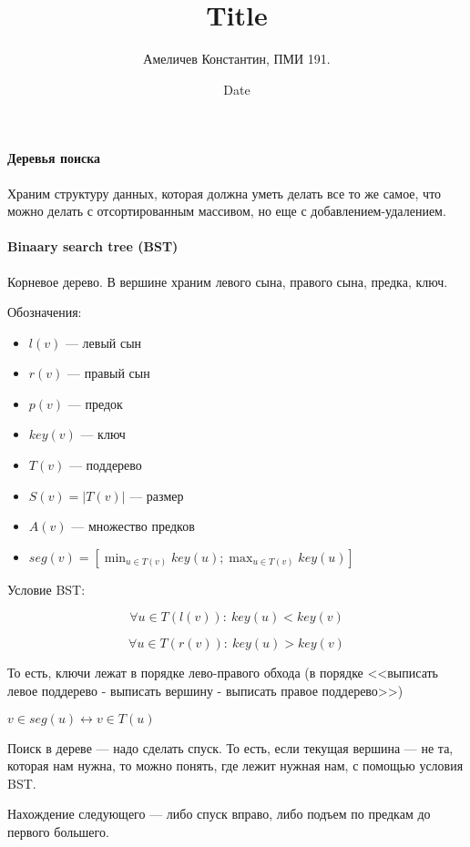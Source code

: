\documentclass[12pt]{article}
\title{Title}
\author{Амеличев Константин, ПМИ 191.}
\date{Date}
\begin{document}
\paragraph{Деревья поиска}
\hspace{\fill}
Храним структуру данных, которая должна уметь делать все то же самое, что можно делать с отсортированным массивом, но еще с добавлением-удалением.

\paragraph{Binaary search tree (BST)}

Корневое дерево. В вершине храним левого сына, правого сына, предка, ключ.

Обозначения:
\begin{itemize}

\item $l(v)$ --- левый сын

\item $r(v)$ --- правый сын

\item $p(v)$ --- предок

\item $key(v)$ --- ключ

\item $T(v)$ --- поддерево

\item $S(v) = |T(v)|$ --- размер

\item $A(v)$ --- множество предков

\item $seg(v) = [\min_{u \in T(v)} key(u); \max_{u \in T(v)} key(u)]$

\end{itemize}

Условие BST: 

$$ \forall u \in T(l(v)):\ key(u) < key(v)$$

$$ \forall u \in T(r(v)):\ key(u) > key(v)$$

То есть, ключи лежат в порядке лево-правого обхода (в порядке <<выписать левое поддерево - выписать вершину - выписать правое поддерево>>)

$v \in seg(u) \leftrightarrow v \in T(u)$

Поиск в дереве --- надо сделать спуск. То есть, если текущая вершина --- не та, которая нам нужна, то можно понять, где лежит нужная нам, с помощью условия BST.

Нахождение следующего --- либо спуск вправо, либо подъем по предкам до первого большего.
\end{document}
